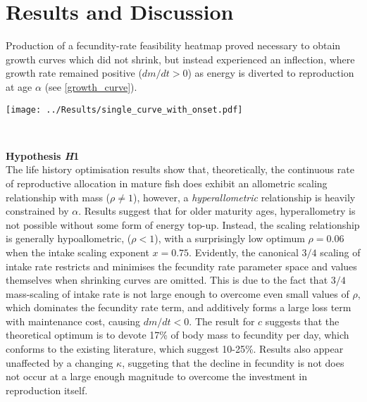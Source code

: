 \documentclass[a4paper]{article} %
\begin{document}
\section{Results and Discussion}\thispagestyle{plain}
Production of a fecundity-rate feasibility heatmap proved necessary to obtain growth curves which did not shrink, but instead experienced an inflection, where growth rate remained positive ($dm/dt > 0$) as energy is diverted to reproduction at age $\alpha$ (see \cref{growth_curve}).
\begin{center}
    \begin{minipage}{0.8\linewidth}
        \texttt{[image: ../Results/single\_curve\_with\_onset.pdf]}
        \label{growth_curve}
    \end{minipage}\\
\end{center}
\vspace{0.5cm}
\textbf{Hypothesis \textit{H}1} \\
The life history optimisation results show that, theoretically, the continuous rate of reproductive allocation in mature fish does exhibit an allometric scaling relationship with mass ($\rho \neq 1$), however, a \textit{hyperallometric} relationship is heavily constrained by $\alpha$. Results suggest that for older maturity ages, hyperallometry is not possible without some form of energy top-up. Instead, the scaling relationship is generally hypoallometric, ($\rho < 1$), with a surprisingly low optimum $\rho = 0.06$ when the intake scaling exponent $x = 0.75$. Evidently, the canonical $3/4$ scaling of intake rate restricts and minimises the fecundity rate parameter space and values themselves when shrinking curves are omitted. This is due to the fact that $3/4$ mass-scaling of intake rate is not large enough to overcome even small values of $\rho$, which dominates the fecundity rate term, and additively forms a large loss term with maintenance cost, causing $dm/dt < 0$. The result for $c$ suggests that the theoretical optimum is to devote 17\% of body mass to fecundity per day, which conforms to the existing literature, which suggest 10-25\%. Results also appear unaffected by a changing $\kappa$, suggeting that the decline in fecundity is not does not occur at a large enough magnitude to overcome the investment in reproduction itself.
\end{document}
